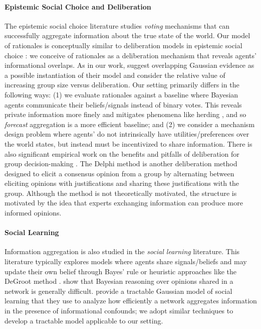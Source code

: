 \paragraph{Epistemic Social Choice and Deliberation} The epistemic social choice literature studies \emph{voting} mechanisms that can successfully aggregate information about the true state of the world.  
Our model of rationales is conceptually similar to deliberation models in epistemic social choice \citep{dietrich2024deliberation, ding2021deliberation}\@: we conceive of rationales as a deliberation mechanism that reveals agents' informational overlaps. As in our work, \citet{dietrich2024deliberation} suggest overlapping Gaussian evidence as a possible instantiation of their model and consider the relative value of increasing group size versus deliberation. Our setting primarily differs in the following ways: (1) we evaluate rationales against a baseline where Bayesian agents communicate their beliefs/signals instead of binary votes. This reveals private information more finely and mitigates phenomena like herding \citep{banerjee1992simple, bikhchandani1998learning}, and so \emph{forecast} aggregation is a more efficient baseline; and (2) we consider a mechanism design problem where agents' do not intrinsically have utilities/preferences over the world states, but instead must be incentivized to share information. There is also significant empirical work on the benefits and pitfalls of deliberation for group decision-making \citep{navajas2018aggregated, graeber2024explanations, lorenz2011social, moshman1998collaborative}. The Delphi method \citep{dalkey1963experimental, helmer1967analysis} is another deliberation method designed to elicit a consensus opinion from a group by alternating between eliciting opinions with justifications and sharing these justifications with the group. Although the method is not theoretically motivated, the structure is motivated by the idea that experts exchanging information can produce more informed opinions. 

\paragraph{Social Learning}  Information aggregation is also studied in the \emph{social learning} \citep{golub2017learning} literature. This literature typically explores models where agents share signals/beliefs and may update their own belief through Bayes' rule \citep{acemoglu2011bayesian} or heuristic approaches like the DeGroot method \citep{degroot1974reaching}. \citet{hkazla2021bayesian} show that Bayesian reasoning over opinions shared in a network is generally difficult. \citet{dasaratha2019aggregative} provide a tractable Gaussian model of social learning that they use to analyze how efficiently a network aggregates information in the presence of informational confounds; we adopt similar techniques to develop a tractable model applicable to our setting.

